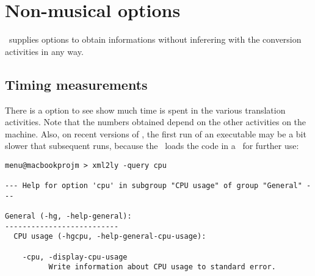 
\chapter{Non-musical options}

\mf\ supplies options to obtain informations without inferering with the conversion activities in any way.


\section{Timing measurements}

There is a  option to see show much time is spent in the various translation activities. Note that the numbers obtained depend on the other activities on the machine. Also, on recent versions of \MacOS, the first run of an executable may be a bit slower that subsequent runs, because the \OS\ loads the code in a \cache\ for further use:
\begin{lstlisting}[language=MusicXML]
menu@macbookprojm > xml2ly -query cpu

--- Help for option 'cpu' in subgroup "CPU usage" of group "General" ---

General (-hg, -help-general):
--------------------------
  CPU usage (-hgcpu, -help-general-cpu-usage):

    -cpu, -display-cpu-usage
          Write information about CPU usage to standard error.
\end{lstlisting}

